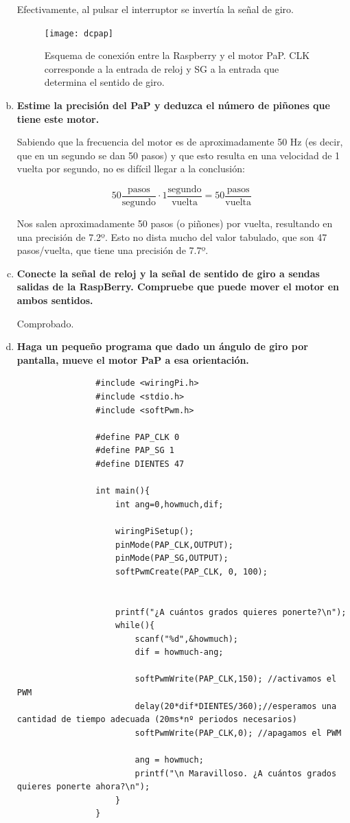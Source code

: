 \documentclass[11pt, a4paper]{article}
\begin{document}
\begin{enumerate}[(a)]
			 Efectivamente, al pulsar el interruptor se invertía la señal de giro.
			 
			 \begin{figure}[h]
				\begin{center}
					\texttt{[image: dcpap]}
					\caption*{Esquema de conexión entre la Raspberry y el motor PaP. CLK corresponde a la entrada de reloj y SG a la entrada que determina el sentido de giro.}
				\end{center}
			\end{figure}
			\item \textbf{Estime la precisión del PaP y deduzca el número de piñones que tiene este motor.}
			
			Sabiendo que la frecuencia del motor es de aproximadamente 50 Hz (es decir, que en un segundo se dan 50 pasos) y que esto resulta en una velocidad de 1 vuelta por segundo, no es difícil llegar a la conclusión:
			
			$$ 50 \dfrac{\text{pasos}}{\text{segundo}} \cdot 1 \dfrac{\text{segundo}}{\text{vuelta}} = 50 \dfrac{\text{pasos}}{\text{vuelta}} $$
			
			Nos salen aproximadamente 50 pasos (o piñones) por vuelta, resultando en una precisión de 7.2º. Esto no dista mucho del valor tabulado, que son 47 pasos/vuelta, que tiene una precisión de 7.7º.
			
			\item \textbf{Conecte la señal de reloj y la señal de sentido de giro a sendas salidas de la RaspBerry. Compruebe que puede mover el motor en ambos sentidos.}
			
			Comprobado.
			
			\item \textbf{Haga un pequeño programa que dado un ángulo de giro por pantalla, mueve el motor PaP a esa orientación.}
			\begin{verbatim}
				#include <wiringPi.h>
				#include <stdio.h>
				#include <softPwm.h>
				
				#define PAP_CLK 0
				#define PAP_SG 1
				#define DIENTES 47
				
				int main(){
				    int ang=0,howmuch,dif;
				    
				    wiringPiSetup();
					pinMode(PAP_CLK,OUTPUT);
					pinMode(PAP_SG,OUTPUT);
					softPwmCreate(PAP_CLK, 0, 100);
				
				
				    printf("¿A cuántos grados quieres ponerte?\n");
				    while(){
				        scanf("%d",&howmuch);
				        dif = howmuch-ang;
				        
				        softPwmWrite(PAP_CLK,150); //activamos el PWM
				        delay(20*dif*DIENTES/360);//esperamos una cantidad de tiempo adecuada (20ms*nº periodos necesarios)
				        softPwmWrite(PAP_CLK,0); //apagamos el PWM
				        
				        ang = howmuch;
				        printf("\n Maravilloso. ¿A cuántos grados quieres ponerte ahora?\n");
				    }
				}
			\end{verbatim}
			
		\end{enumerate}
\end{document}
